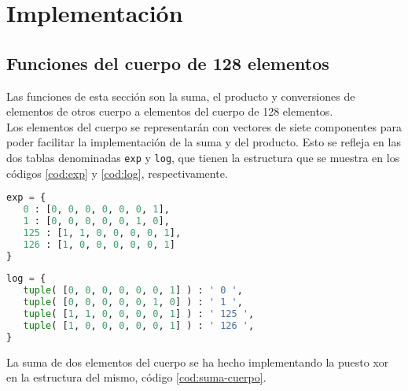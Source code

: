 \chapter{Implementación}
\label{sec:implementacion}


\section{Funciones del cuerpo de 128 elementos}
Las funciones de esta sección son la suma, el producto y conversiones de elementos de otros cuerpo a elementos del cuerpo de 128 elementos.\\

Los elementos del cuerpo se representarán con vectores de siete componentes para poder facilitar la implementación de la suma y del producto. Esto se refleja en las dos tablas denominadas \texttt{exp} y \texttt{log}, que tienen la estructura que se muestra en los códigos \ref{cod:exp} y \ref{cod:log}, respectivamente.\\

\begin{lstlisting}[language=Python,caption=Tabla para calcular la potencia en el cuerpo, label=cod:exp]
exp = {
   0 : [0, 0, 0, 0, 0, 0, 1],
   1 : [0, 0, 0, 0, 0, 1, 0],
   125 : [1, 1, 0, 0, 0, 0, 1],
   126 : [1, 0, 0, 0, 0, 0, 1]
}

\end{lstlisting}

\begin{lstlisting}[language=Python,caption=Tabla para calcular el logaritmo en el cuerpo, label=cod:log]
log = {
   tuple( [0, 0, 0, 0, 0, 0, 1] ) : ' 0 ',
   tuple( [0, 0, 0, 0, 0, 1, 0] ) : ' 1 ',
   tuple( [1, 1, 0, 0, 0, 0, 1] ) : ' 125 ',
   tuple( [1, 0, 0, 0, 0, 0, 1] ) : ' 126 ',
}
\end{lstlisting}

La suma de dos elementos del cuerpo se ha hecho implementando la puesto xor en la estructura del mismo, código \ref{cod:suma-cuerpo}.\\

